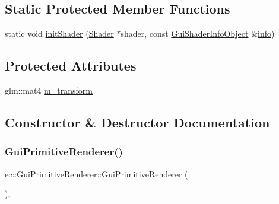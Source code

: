 \subsection*{Static Protected Member Functions}
\begin{DoxyCompactItemize}
\item 
static void \mbox{\hyperlink{classec_1_1_gui_primitive_renderer_a50485915bde54b1e786de6bd2017d4dd}{init\+Shader}} (\mbox{\hyperlink{classec_1_1_shader}{Shader}} $\ast$shader, const \mbox{\hyperlink{structec_1_1_gui_shader_info_object}{Gui\+Shader\+Info\+Object}} \&\mbox{\hyperlink{namespaceec_a67e511e8b22e1051ea392cb2f68315d8acaf9b6b99962bf5c2264824231d7a40c}{info}})
\end{DoxyCompactItemize}
\subsection*{Protected Attributes}
\begin{DoxyCompactItemize}
\item 
glm\+::mat4 \mbox{\hyperlink{classec_1_1_gui_primitive_renderer_a7ebd149e4d4e0b043d928391041000bf}{m\+\_\+transform}}
\end{DoxyCompactItemize}


\subsection{Constructor \& Destructor Documentation}
\mbox{\label{classec_1_1_gui_primitive_renderer_ad5dec69952ed7ee82769fecb40a83fe8}} 
\subsubsection{\texorpdfstring{Gui\+Primitive\+Renderer()}{GuiPrimitiveRenderer()}}
{\footnotesize\ttfamily ec\+::\+Gui\+Primitive\+Renderer\+::\+Gui\+Primitive\+Renderer (\begin{DoxyParamCaption}{ }\end{DoxyParamCaption})\hspace{0.3cm}{\ttfamily [explicit]}, {\ttfamily [default]}}

\mbox{\label{classec_1_1_gui_primitive_renderer_abd5bd68a4ba482a2fa7ef9650c289ca8}} 
